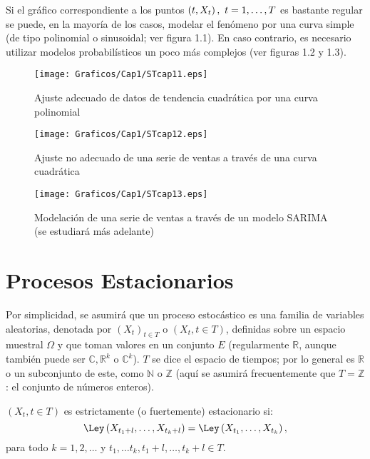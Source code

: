 Si el gr\'{a}fico correspondiente a los puntos $\left( t,X_{t} \right),\thinspace \thinspace t=1,\mathellipsis ,T$ es bastante regular se puede, en la mayor\'{i}a de los casos, modelar el fen\'{o}meno por una curva simple (de tipo polinomial o sinusoidal; ver figura 1.1). En caso contrario, es necesario utilizar modelos probabil\'{i}sticos un poco m\'{a}s complejos (ver figuras 1.2 y 1.3).

\begin{figure}[H]\centering
\texttt{[image: Graficos/Cap1/STcap11.eps]}
\caption{Ajuste adecuado de datos de tendencia cuadr\'{a}tica por una 
curva polinomial}\label{fig1}
\end{figure}

\begin{figure}[H]\centering
\texttt{[image: Graficos/Cap1/STcap12.eps]}
\caption{Ajuste no adecuado de una serie de ventas a trav\'{e}s de una 
curva cuadr\'{a}tica}\label{fig2}
\end{figure}


\begin{figure}[H]\centering
\texttt{[image: Graficos/Cap1/STcap13.eps]}
\caption{Modelaci\'{o}n de una serie de ventas a través de un modelo SARIMA (se estudiar\'{a} m\'{a}s adelante)}\label{fig3}
\end{figure}



\section{Procesos Estacionarios}

Por simplicidad, se asumir\'{a} que un proceso estoc\'{a}stico es una familia de variables aleatorias, denotada por ${(X_{t})}_{t\in T}$ o $(X_{t}, t\in T)$, definidas sobre un espacio muestral $\Omega$ y que toman valores en un conjunto $E$ (regularmente $\mathbb{R}$, aunque tambi\'{e}n puede ser $\mathbb{C},\mathbb{R}^{k}$ o $\mathbb{C}^{k}$). $T$ se dice el espacio de tiempos; por lo general es $\mathbb{R}$ o un subconjunto de este, como $\mathbb{N}$ o $\mathbb{Z}$ (aqu\'{i} se asumir\'{a} frecuentemente que $T=\mathbb{Z}$: el conjunto de n\'{u}meros enteros).

\begin{definicion}
 $(X_{t}, t\in T)$ es estrictamente (o fuertemente) 
estacionario si:
\[
\Ley\left(X_{t_1+l},\dots,X_{t_k+l}\right) = 
\Ley\left(X_{t_1},\dots,X_{t_k}\right),
\]
para todo $k=1,2,\dots$ y $t_{1},\dots t_{k}, t_{1}+l,\dots,t_{k}+l\in T$.
\end{definicion}

